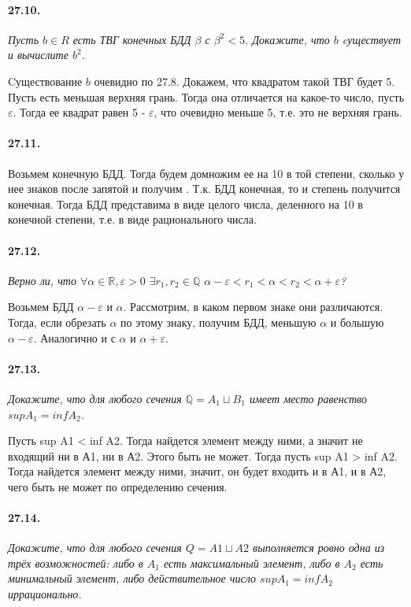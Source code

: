 \documentclass{book}
\begin{document}
\paragraph{27.10.}
\textit{Пусть $b \in R$ есть ТВГ конечных БДД $\beta$ с $\beta^2 < 5$. Докажите, что $b$ cуществует и вычислите $b^2$.}

Cуществование $b$ очевидно по 27.8. Докажем, что квадратом такой ТВГ будет 5. Пусть есть меньшая верхняя грань. Тогда она отличается на какое-то число, пусть $\varepsilon$. Тогда ее квадрат равен 5 - $\varepsilon$, что очевидно меньше 5, т.е. это не верхняя грань. 

\paragraph{27.11.}
Возьмем конечную БДД. Тогда будем домножим ее на 10 в той степени, сколько у нее знаков после запятой и получим . Т.к. БДД конечная, то и степень получится конечная. Тогда БДД представима в виде целого числа, деленного на 10 в конечной степени, т.е. в виде рационального числа.

\paragraph{27.12.}
\textit{Верно ли, что $\forall \alpha \in \mathbb{R}, \varepsilon > 0$ $\exists r_1, r_2 \in \mathbb{Q}$ $\alpha - \varepsilon < r_1 < \alpha < r_2 < \alpha + \varepsilon$?} 

Возьмем БДД $\alpha - \varepsilon$ и $\alpha$. Рассмотрим, в каком первом знаке они различаются. Тогда, если обрезать $\alpha$ по этому знаку, получим БДД, меньшую $\alpha$ и большую $\alpha - \varepsilon$. Аналогично и с $\alpha$ и $\alpha + \varepsilon$.

\paragraph{27.13.}
\textit{Докажите, что для любого сечения $\mathbb{Q} = A_1 \sqcup B_1$ имеет место равенство $sup A_1 = inf A_2$.}

Пусть sup A1 < inf A2. Тогда найдется элемент между ними, а значит не входящий ни в А1, ни в А2. Этого быть не может. Тогда пусть sup A1 > inf A2. Тогда найдется элемент между ними, значит, он будет входить и в А1, и в А2, чего быть не может по определению сечения.

\paragraph{27.14.}
\textit{Докажите, что для любого сечения $Q = A1 \sqcup A2$ выполняется ровно одна из трёх возможностей: либо в $A_1$ есть максимальный элемент, либо в $A_2$ есть минимальный
элемент, либо действительное число $sup A_1 = inf A_2$ иррационально.}
\end{document}
